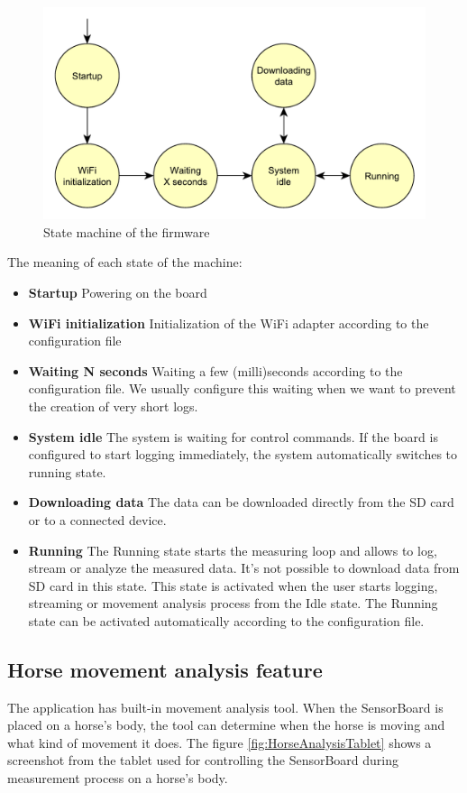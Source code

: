 \begin{figure}
	\centering
	\label{firmwareStateMachine}
	\caption{State machine of the firmware}
	\includegraphics[width=16cm]{img/firmwareStateMachine.pdf}
\end{figure}

The meaning of each state of the machine:
\begin{itemize}
	\item \textbf{Startup} Powering on the board
	\item \textbf{WiFi initialization} Initialization of the WiFi adapter according to the configuration file
	\item \textbf{Waiting N seconds} Waiting a few (milli)seconds according to the configuration file. We usually configure this waiting when we want to prevent the creation of very short logs.
	\item \textbf{System idle} The system is waiting for control commands. If the board is configured to start logging immediately, the system automatically switches to running state.
	\item \textbf{Downloading data} The data can be downloaded directly from the SD card or to a connected device.
	\item \textbf{Running} The Running state starts the measuring loop and allows to log, stream or analyze the measured data. It's not possible to download data from SD card in this state. This state is activated when the user starts logging, streaming or movement analysis process from the Idle state. The Running state can be activated automatically according to the configuration file.
\end{itemize}

\subsection{Horse movement analysis feature}
The application has built-in movement analysis tool. When the SensorBoard is placed on a horse's body, the tool can determine when the horse is moving and what kind of movement it does. The figure \ref{fig:HorseAnalysisTablet} shows a screenshot from the tablet used for controlling the SensorBoard during measurement process on a horse's body.


